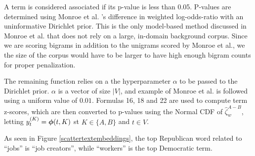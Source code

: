 \documentclass[11pt,a4paper]{article}
\begin{document}
A term is considered associated if its p-value is less than 0.05.  P-values are determined using Monroe et al. 's difference in weighted log-odds-ratio with an uninformative Dirichlet prior.  This is the only model-based method discussed in Monroe et al. that does not rely on a large, in-domain background corpus. Since we are scoring bigrams in addition to the unigrams scored by Monroe et al., we the size of the corpus would have to be larger to have high enough bigram counts for proper penalization.

The remaining function relies on a the hyperparameter \mbox{\boldmath$\alpha$} to be passed to the Dirichlet prior.  \mbox{\boldmath$\alpha$} is a vector of size $|V|$, and example of Monroe et al. is followed using a uniform value of $0.01$.  Formulas 16, 18 and 22 are used to compute term z-scores, which are then converted to p-values using the Normal CDF of $\hat{\zeta}_{w}^{A-B}$, letting $y^{(K)}_{t} = \mbox{\boldmath$\phi$}(t,K)$ st ${K}\in{\{A,B\}}$ and $t\in{V}$.

As seen in Figure \ref{scattertextembeddings}, the top Republican word related to ``jobs'' is ``job creators'', while ``workers'' is the top Democratic term.
\vspace{-0.3cm}


\end{document}
